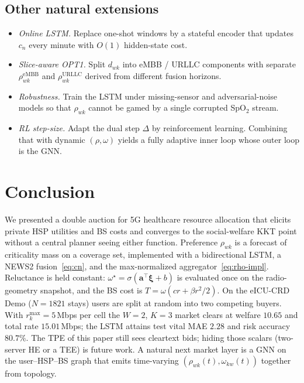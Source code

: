 \documentclass[journal,a4paper,10pt]{IEEEtran}
\begin{document}
\subsection{Other natural extensions}
\begin{itemize}
  \item \emph{Online LSTM.} Replace one-shot windows by a stateful encoder that updates \(c_n\) every minute with \(O(1)\) hidden-state cost.
  \item \emph{Slice-aware OPT1.} Split \(d_{wk}\) into eMBB / URLLC components with separate \(\rho_{wk}^{\mathrm{eMBB}}\) and \(\rho_{wk}^{\mathrm{URLLC}}\) derived from different fusion horizons.
  \item \emph{Robustness.} Train the LSTM under missing-sensor and adversarial-noise models so that \(\rho_{wk}\) cannot be gamed by a single corrupted SpO\(_2\) stream.
  \item \emph{RL step-size.} Adapt the dual step \(\Delta\) by reinforcement learning. Combining that with dynamic \((\rho,\omega)\) yields a fully adaptive inner loop whose outer loop is the GNN.
\end{itemize}

\section{Conclusion}
\label{sec:conc}

We presented a double auction for 5G healthcare resource allocation that elicits private HSP utilities and BS costs and converges to the social-welfare KKT point without a central planner seeing either function. Preference \(\rho_{wk}\) is a forecast of criticality mass on a coverage set, implemented with a bidirectional LSTM, a NEWS2 fusion~\eqref{eq:cn}, and the max-normalized aggregator~\eqref{eq:rho-impl}. Reluctance is held constant: \(\omega^\star=\sigma(\mathbf{a}^\top\boldsymbol{\xi}+b)\) is evaluated once on the radio-geometry snapshot, and the BS cost is \(T=\omega(cr+\beta r^2/2)\). On the eICU-CRD Demo (\(N=1821\) stays) users are split at random into two competing buyers. With \(r_k^{\max}=5\)\,Mbps per cell the \(W=2\), \(K=3\) market clears at welfare \(10.65\) and total rate \(15.01\)\,Mbps; the LSTM attains test vital MAE \(2.28\) and risk accuracy \(80.7\%\). The TPE of this paper still sees cleartext bids; hiding those scalars (two-server HE or a TEE) is future work. A natural next market layer is a GNN on the user--HSP--BS graph that emits time-varying \((\rho_{wk}(t),\omega_{kw}(t))\) together from topology.
\end{document}
